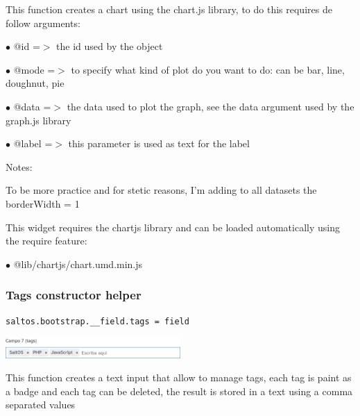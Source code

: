 \documentclass[a4paper]{article}
\begin{document}
This function creates a chart using the chart.js library, to do this requires de follow arguments:

\begin{compactitem}
\item[\color{myblue}$\bullet$] @id    =$>$ the id used by the object
\item[\color{myblue}$\bullet$] @mode  =$>$ to specify what kind of plot do you want to do: can be bar, line, doughnut, pie
\item[\color{myblue}$\bullet$] @data  =$>$ the data used to plot the graph, see the data argument used by the graph.js library
\item[\color{myblue}$\bullet$] @label =$>$ this parameter is used as text for the label
\end{compactitem}

Notes:

To be more practice and for stetic reasons, I'm adding to all datasets the borderWidth = 1

This widget requires the chartjs library and can be loaded automatically using the require
feature:

\begin{compactitem}
\item[\color{myblue}$\bullet$] @lib/chartjs/chart.umd.min.js
\end{compactitem}

\hypertarget{toc79}{}
\subsubsection{Tags constructor helper}

\begin{lstlisting}
saltos.bootstrap.__field.tags = field
\end{lstlisting}

\begin{center}\includegraphics[width=0.5\textwidth]{../ujest/snaps/test-bootstrap-js-bootstrap-campo-7-tags-1-snap.png}\end{center}

This function creates a text input that allow to manage tags, each tag is paint as a badge
and each tag can be deleted, the result is stored in a text using a comma separated values
\end{document}

